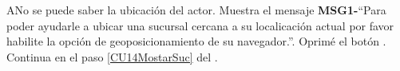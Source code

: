	\begin{UCtrayectoriaA}{A}{No se puede saber la ubicación del actor.}
		\UCpaso Muestra el mensaje {\bf MSG1-}``Para poder ayudarle a ubicar una sucursal cercana a su localicación actual por favor habilite la opción de geoposicionamiento de su navegador.''.
		\UCpaso[\UCactor] Oprimé el botón .
		\UCpaso Continua en el paso \ref{CU14MostarSuc} del .
	\end{UCtrayectoriaA}
		
%
%		
